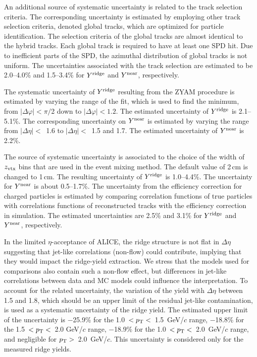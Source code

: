 An additional source of systematic uncertainty is related to the track selection criteria. The corresponding uncertainty is estimated by employing other track selection criteria, denoted global tracks, which are optimized for particle identification. The selection criteria of the global tracks are almost identical to the hybrid tracks. Each global track is required to have at least one SPD hit. 
Due to inefficient parts of the SPD, the azimuthal distribution of global tracks is not uniform.
The uncertainties associated with the track selection are estimated to be 2.0--4.0\% and 1.5--3.4\% for $Y^{\rm{ridge}}$ and $Y^{\rm{near}}$, respectively.

The systematic uncertainty of $Y^{\rm{ridge}}$ resulting from the ZYAM procedure is estimated by varying the range of the fit, which is used to find the minimum, from $|\Delta\varphi|<\pi/$2 down to $|\Delta\varphi|<1.2$. The estimated uncertainty of $Y^{\rm{ridge}}$ is 2.1--5.1\%. The corresponding uncertainty on $Y^{\rm{near}}$ is estimated by varying the range from $|\Delta\eta|<$~1.6 to $|\Delta\eta|<$~1.5 and 1.7. The estimated uncertainty of $Y^{\rm{near}}$ is 2.2\%.

The source of systematic uncertainty is associated to the choice of the width of $z_{\rm vtx}$ bins that are used in the event mixing method. The default value of 2\,cm is changed to 1\,cm. The resulting uncertainty of $Y^{\rm{ridge}}$ is 1.0--4.4\%.
The uncertainty for $Y^{\rm{near}}$ is about 0.5--1.7\%. The uncertainty from the efficiency correction for charged particles is estimated by comparing correlation functions of true particles with correlations functions of reconstructed tracks with the efficiency correction in simulation. The estimated uncertainties are 2.5\% and 3.1\% for $Y^{\rm{ridge}}$ and $Y^{\rm{near}}$, respectively. 

In the limited $\eta$-acceptance of ALICE, the ridge structure is not flat in $\Delta \eta$ suggesting that jet-like correlations (non-flow) could contribute, implying that they would impact the ridge-yield extraction. We stress that the models used for comparisons also contain such a non-flow effect, but differences in jet-like correlations between data and MC models could influence the interpretation. To account for the related uncertainty, the variation of the yield with $\Delta\eta$ between 1.5 and 1.8, which should be an upper limit of the residual jet-like contamination, is used as a systematic uncertainty of the ridge yield. The estimated upper limit of the uncertainty is $-$25.9\% for the 1.0~$<p_\mathrm{T}<$~1.5~GeV/$c$ range,  $-$18.8\% for the 1.5~$<p_\mathrm{T}<$~2.0 GeV/$c$ range,  $-$18.9\% for the 1.0~$<p_\mathrm{T}<$~2.0~GeV/$c$ range, and negligible for $p_\mathrm{T}>$~2.0~GeV/$c$. This uncertainty is considered only for the measured ridge yields.

